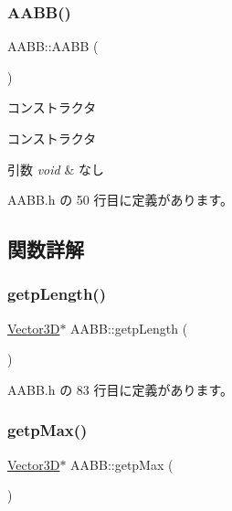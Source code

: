 \subsubsection{\texorpdfstring{A\+A\+B\+B()}{AABB()}}
{\footnotesize\ttfamily A\+A\+B\+B\+::\+A\+A\+BB (\begin{DoxyParamCaption}{ }\end{DoxyParamCaption})\hspace{0.3cm}{\ttfamily [inline]}}



コンストラクタ 

コンストラクタ 
\begin{DoxyParams}{引数}
{\em void} & なし \\
\hline
\end{DoxyParams}


 A\+A\+B\+B.\+h の 50 行目に定義があります。



\subsection{関数詳解}
\mbox{\label{class_a_a_b_b_a9e82e2bdab1dd84633dddbf8bfe561f8}} 
\subsubsection{\texorpdfstring{getp\+Length()}{getpLength()}}
{\footnotesize\ttfamily \mbox{\hyperlink{class_vector3_d}{Vector3D}}$\ast$ A\+A\+B\+B\+::getp\+Length (\begin{DoxyParamCaption}{ }\end{DoxyParamCaption})\hspace{0.3cm}{\ttfamily [inline]}}



 A\+A\+B\+B.\+h の 83 行目に定義があります。

\mbox{\label{class_a_a_b_b_ae7e52b55b90b1c6d02a8a75527d38c9e}} 
\subsubsection{\texorpdfstring{getp\+Max()}{getpMax()}}
{\footnotesize\ttfamily \mbox{\hyperlink{class_vector3_d}{Vector3D}}$\ast$ A\+A\+B\+B\+::getp\+Max (\begin{DoxyParamCaption}{ }\end{DoxyParamCaption})\hspace{0.3cm}{\ttfamily [inline]}}



